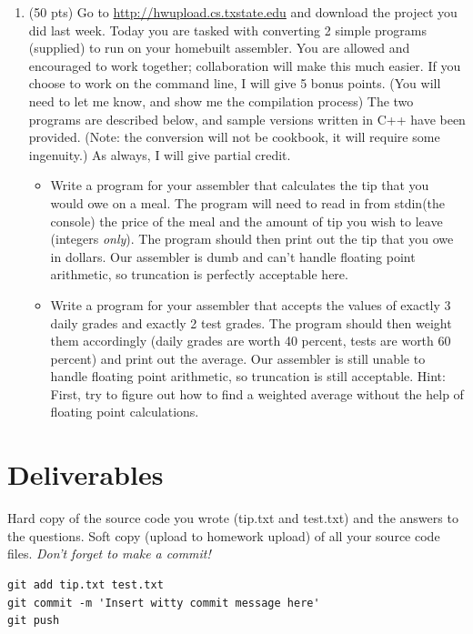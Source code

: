 \documentclass[letterpaper,12pt]{article}
\begin{document}
\begin{enumerate}
\begin{lstlisting}
        }
    \end{lstlisting}
\item (50 pts) Go to \url{http://hwupload.cs.txstate.edu} and download the project you did last week. Today
               you are tasked with converting 2 simple programs (supplied) to run on your homebuilt
               assembler. You are allowed and encouraged to work together; collaboration will make this
               much easier. If you choose to work on the command line, I will give 5 bonus points. (You
               will need to let me know, and show me the compilation process) The two programs are described
               below, and sample versions written in C++ have been provided. (Note: the conversion will
               not be cookbook, it will require some ingenuity.) As always, I will give partial credit.
               \begin{itemize}
                   \item Write a program for your assembler that calculates the tip that you would
                       owe on a meal. The program will need to read in from stdin(the console) the price of the
                       meal and the amount of tip you wish to leave (integers \emph{only}).
                       The program should then print out the tip that you owe in dollars. Our assembler
                       is dumb and can’t handle floating point arithmetic, so truncation is perfectly
                       acceptable here.
                   \item Write a program for your assembler that accepts the values of exactly 3 daily
                         grades and exactly 2 test grades. The program should then weight them accordingly
                         (daily grades are worth 40 percent, tests are worth 60 percent)
                         and print out the average. Our assembler is still unable to handle floating point
                         arithmetic, so truncation is still acceptable. Hint: First, try to figure out how
                         to find a weighted average without the help of floating point calculations.
               \end{itemize}
\end{enumerate}
\section*{Deliverables}
Hard copy of the source code you wrote (tip.txt and test.txt)
and the answers to the questions. Soft copy (upload to homework upload) of all your source code files.
\emph{Don't forget to make a commit!}
\begin{lstlisting}
git add tip.txt test.txt
git commit -m 'Insert witty commit message here'
git push
\end{lstlisting}
\end{document}
